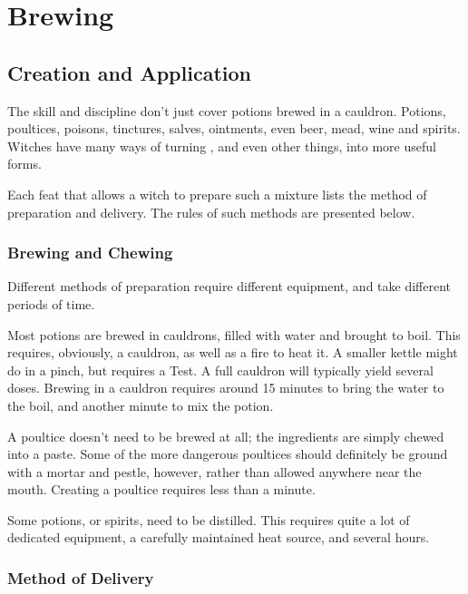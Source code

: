 \chapter{Brewing}

\section{Creation and Application}

The  skill and  discipline don't just cover potions brewed in a cauldron.
Potions, poultices, poisons, tinctures, salves, ointments, even beer, mead, wine and spirits.
Witches have many ways of turning , and even other things, into more useful forms.

Each feat that allows a witch to prepare such a mixture lists the method of preparation and delivery.
The rules of such methods are presented below.

\subsection{Brewing and Chewing}

Different methods of preparation require different equipment, and take different periods of time.

Most potions are brewed in cauldrons, filled with water and brought to boil.
This requires, obviously, a cauldron, as well as a fire to heat it.
A smaller kettle might do in a pinch, but requires a Test.
A full cauldron will typically yield several doses.
Brewing in a cauldron requires around 15 minutes to bring the water to the boil, and another minute to mix the potion.

A poultice doesn't need to be brewed at all; the ingredients are simply chewed into a paste.
Some of the more dangerous poultices should definitely be ground with a mortar and pestle, however, rather than allowed anywhere near the mouth.
Creating a poultice requires less than a minute.

Some potions, or spirits, need to be distilled.
This requires quite a lot of dedicated equipment, a carefully maintained heat source, and several hours.

\subsection{Method of Delivery}

